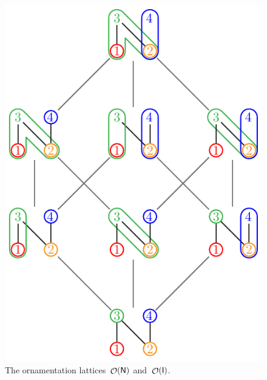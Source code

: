 \documentclass{amsart}
\theoremstyle{definition}
\renewcommand{\c}[1]{\mathcal{#1}} %
\DeclareMathOperator{\Orn}{\c{O}}  %
\newcommand{\Igraph}{\sf I} %
\newcommand{\Ngraph}{\sf N} %
\begin{document}
\begin{figure}[b]
	\centerline{\includegraphics[scale=.68]{ornamentationsN} \qquad {}}
	\caption{The ornamentation lattices~$\Orn(\Ngraph)$ and~$\Orn(\Igraph)$.}
	\label{fig:ornamentationsNI}
\end{figure}
\end{document}
